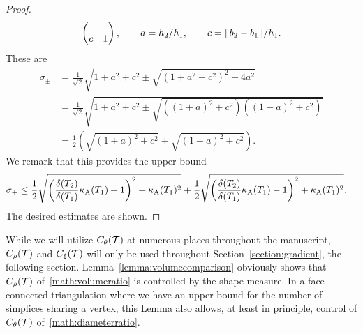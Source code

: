 \documentclass[10pt,a4paper]{article}
\begin{document}
\begin{proof}
\begin{align*}
\begin{pmatrix}
            \\
            c & 1
        \end{pmatrix},
        \qquad 
        a = h_2 / h_1,
        \qquad 
        c = \|  b_2-b_1  \| / h_1
        .
    \end{align*}
    These are 
    \begin{align*}
        \sigma_{\pm} 
        &
        = 
        \frac{1}{\sqrt{2}} \sqrt{ 1 + a^2 + c^2 \pm \sqrt{ \left( 1 + a^2 + c^2 \right)^{2} - 4a^{2} } } 
        \\&
        =
        \frac{1}{\sqrt{2}} \sqrt{ 1 + a^2 + c^2 \pm \sqrt{ \left( (1+a)^2 + c^2 \right)\left( (1-a)^2 + c^2 \right) } } 
        \\&
        =
        \frac{1}{2} 
        \left( \sqrt{ (1 + a)^2 + c^2 } \pm \sqrt{ (1 - a)^2 + c^2 } \right)
        .
    \end{align*}
    We remark that this provides the upper bound 
    \begin{align*}
        \sigma_{+} 
        &
        \leq 
        \frac{1}{2} 
        \sqrt{ \left( \frac{ {\delta}(T_2) }{ {\delta}(T_1) } \kappa_{\rm A}(T_{1}) + 1 \right)^{2} + \kappa_{\rm A}(T_{1})^{2} }
        +
        \frac{1}{2} 
        \sqrt{ \left( \frac{ {\delta}(T_2) }{ {\delta}(T_1) } \kappa_{\rm A}(T_{1}) - 1 \right)^{2} + \kappa_{\rm A}(T_{1})^{2} }
        .
    \end{align*}
    The desired estimates are shown.
\end{proof}

\begin{remark}
    While we will utilize $C_\theta({\mathcal T})$ at numerous places throughout the manuscript, 
    $C_\rho({\mathcal T})$ and $C_\xi({\mathcal T})$ will only be used throughout Section~\ref{section:gradient},
    the following section.  
    Lemma~\ref{lemma:volumecomparison} obviously shows that $C_\rho({\mathcal T})$ of~\eqref{math:volumeratio} is controlled by the shape measure. In a face-connected triangulation where we have an upper bound for the number of simplices sharing a vertex, 
    this Lemma also allows, at least in principle, control of $C_\theta({\mathcal T})$ of~\eqref{math:diameterratio}.
\end{remark}
\end{document}
